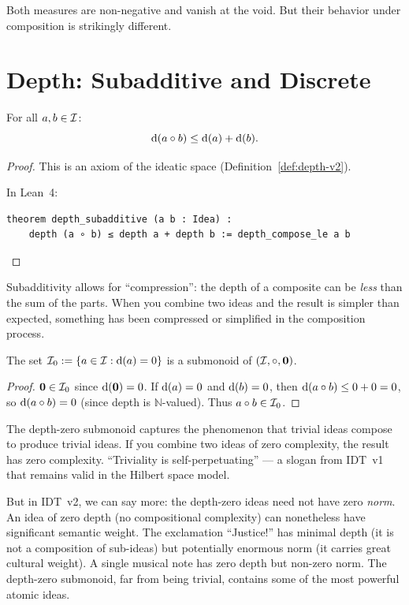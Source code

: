 Both measures are non-negative and vanish at the void. But their behavior under
composition is strikingly different.


\section{Depth: Subadditive and Discrete}

\begin{theorem}
\label{thm:depth-subadditive}
For all $a, b \in \mathcal{I}$:
\[
  \operatorname{d}(a \circ b) \leq \operatorname{d}(a) + \operatorname{d}(b).
\]
\end{theorem}

\begin{proof}
This is an axiom of the ideatic space (Definition~\ref{def:depth-v2}).

In Lean~4:
\begin{lstlisting}
theorem depth_subadditive (a b : Idea) :
    depth (a ∘ b) ≤ depth a + depth b := depth_compose_le a b
\end{lstlisting}
\end{proof}

Subadditivity allows for ``compression'': the depth of a composite can be
\emph{less} than the sum of the parts. When you combine two ideas and the
result is simpler than expected, something has been compressed or simplified in
the composition process.

\begin{proposition}
\label{prop:depth-zero-submonoid}
The set $\mathcal{I}_0 := \{a \in \mathcal{I} : \operatorname{d}(a) = 0\}$ is a submonoid of $(\mathcal{I},
\circ, \mathbf{0})$.
\end{proposition}

\begin{proof}
$\mathbf{0} \in \mathcal{I}_0$ since $\operatorname{d}(\mathbf{0}) = 0$. If $\operatorname{d}(a) = 0$ and
$\operatorname{d}(b) = 0$, then $\operatorname{d}(a \circ b) \leq 0 + 0 = 0$, so
$\operatorname{d}(a \circ b) = 0$ (since depth is $\mathbb{N}$-valued). Thus
$a \circ b \in \mathcal{I}_0$.
\end{proof}

\begin{interpretation}
\label{interp:trivial}
The depth-zero submonoid captures the phenomenon that trivial ideas compose to
produce trivial ideas. If you combine two ideas of zero complexity, the result
has zero complexity. ``Triviality is self-perpetuating'' --- a slogan from
IDT~v1 that remains valid in the Hilbert space model.

But in IDT~v2, we can say more: the depth-zero ideas need not have zero
\emph{norm}. An idea of zero depth (no compositional complexity) can
nonetheless have significant semantic weight. The exclamation ``Justice!'' has
minimal depth (it is not a composition of sub-ideas) but potentially enormous
norm (it carries great cultural weight). A single musical note has zero depth
but non-zero norm. The depth-zero submonoid, far from being trivial, contains
some of the most powerful atomic ideas.
\end{interpretation}


